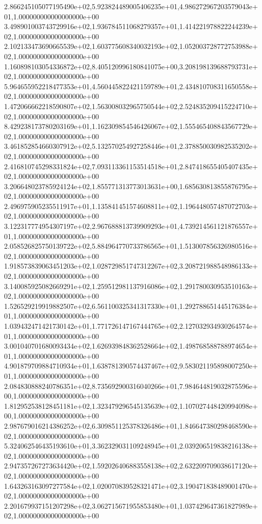 2.866245105077195490e+02,5.923824489005406235e+01,4.986272967203579043e+01,1.000000000000000000e+00
3.498901003743729916e+02,1.936784511068279357e+01,1.414221978822244239e+02,1.000000000000000000e+00
2.102133473690665539e+02,1.603775608340032193e+02,1.052003728772753988e+02,1.000000000000000000e+00
1.160898103054336872e+02,8.405120996180841075e+00,3.208198139688793731e+02,1.000000000000000000e+00
5.964655952218477353e+01,4.560445822421159789e+01,2.434810708311650558e+02,1.000000000000000000e+00
1.472066662218590807e+02,1.563008032965750544e+02,2.524835209415224710e+02,1.000000000000000000e+00
8.429238173780203169e+01,1.162309854546426067e+02,1.555465408843567729e+02,1.000000000000000000e+00
3.461852854660307912e+02,5.132570254927258446e+01,2.378850030982535202e+02,1.000000000000000000e+00
2.416810745298331824e+02,7.093113361153514518e+01,2.847418655405407435e+02,1.000000000000000000e+00
3.206648023785924124e+02,1.855771313773013631e+00,1.685630813855876795e+02,1.000000000000000000e+00
2.496975905235511917e+01,1.135841451574608811e+02,1.196448057487072703e+02,1.000000000000000000e+00
3.122317774954307197e+02,2.967688813739909293e+01,4.739214561121876557e+01,1.000000000000000000e+00
2.058526825750139722e+02,5.884964770733786565e+01,1.513007856326980516e+02,1.000000000000000000e+00
1.918573839063451203e+02,1.028729851747312267e+02,3.208721988548986133e+02,1.000000000000000000e+00
3.140085925082669291e+02,1.259512981137916086e+02,1.291780030953510163e+02,1.000000000000000000e+00
1.526529219919882507e+02,6.561100325341317330e+01,1.292788651445176384e+01,1.000000000000000000e+00
1.039432471421730142e+01,1.771726147167444765e+02,2.127032934930264574e+01,1.000000000000000000e+00
3.001040701680093434e+02,1.626939848362528664e+02,1.498768588788974654e+01,1.000000000000000000e+00
4.901879709884710934e+01,1.638781390574437467e+02,9.583021195898007250e+01,1.000000000000000000e+00
2.084830888240786351e+02,8.735692900316040266e+01,7.984644819032875596e+00,1.000000000000000000e+00
1.812952538128451181e+02,1.323479296545135639e+02,1.107027448420994098e+00,1.000000000000000000e+00
2.987679016214386252e+02,6.309851125378326486e+01,1.846647380298468590e+02,1.000000000000000000e+00
5.324062546435193610e+01,3.362329031109248945e+01,2.039206519838216138e+02,1.000000000000000000e+00
2.947357267273634420e+02,1.592026406883558138e+02,2.632209709038617120e+02,1.000000000000000000e+00
1.643263163097277584e+02,1.020070839528321471e+02,3.190471838489001470e+02,1.000000000000000000e+00
2.201679937151207298e+02,3.062715671955853480e+01,1.037429647361827989e+02,1.000000000000000000e+00
